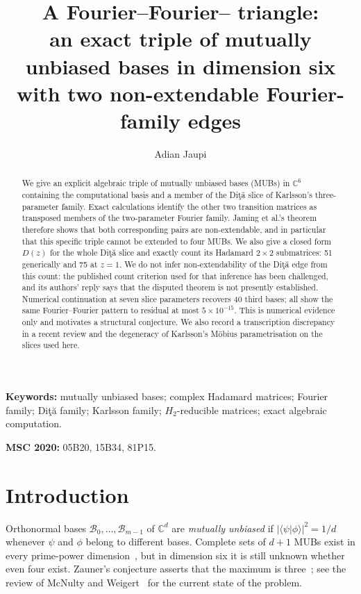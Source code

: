 \documentclass[11pt]{article}
\title{A Fourier--Fourier--\Dita{} triangle:\\
an exact triple of mutually unbiased bases in dimension six\\
with two non-extendable Fourier-family edges}
\author{Adian Jaupi%
}
\date{}
\numberwithin{equation}{section}
\theoremstyle{plain}
\theoremstyle{definition}
\theoremstyle{remark}
\newcommand{\C}{\mathbb{C}}
\newcommand{\Dita}{\texorpdfstring{Di\c{t}\u{a}}{Dita}}
\begin{document}
\maketitle

\begin{abstract}
We give an explicit algebraic triple of mutually unbiased bases (MUBs) in $\C^6$ containing the computational basis and a member of the \Dita{} slice of Karlsson's three-parameter family. Exact calculations identify the other two transition matrices as transposed members of the two-parameter Fourier family. Jaming et al.'s theorem therefore shows that both corresponding pairs are non-extendable, and in particular that this specific triple cannot be extended to four MUBs. We also give a closed form $D(z)$ for the whole \Dita{} slice and exactly count its Hadamard $2\times2$ submatrices: 51 generically and 75 at $z=1$. We do not infer non-extendability of the \Dita{} edge from this count: the published count criterion used for that inference has been challenged, and its authors' reply says that the disputed theorem is not presently established. Numerical continuation at seven slice parameters recovers 40 third bases; all show the same Fourier--Fourier pattern to residual at most $5\times10^{-15}$. This is numerical evidence only and motivates a structural conjecture. We also record a transcription discrepancy in a recent review and the degeneracy of Karlsson's M\"obius parametrisation on the slices used here.
\end{abstract}

\noindent\textbf{Keywords:} mutually unbiased bases; complex Hadamard matrices; Fourier family; \Dita{} family; Karlsson family; $H_2$-reducible matrices; exact algebraic computation.

\noindent\textbf{MSC 2020:} 05B20, 15B34, 81P15.

\section{Introduction}\label{sec:intro}

Orthonormal bases $\mathcal B_0,\dots,\mathcal B_{m-1}$ of $\C^d$ are \emph{mutually unbiased} if $|\langle\psi|\phi\rangle|^2=1/d$ whenever $\psi$ and $\phi$ belong to different bases. Complete sets of $d+1$ MUBs exist in every prime-power dimension~\cite{Ivanovic1981,Wootters1989}, but in dimension six it is still unknown whether even four exist. Zauner's conjecture asserts that the maximum is three~\cite{Zauner1999}; see the review of McNulty and Weigert~\cite{McNultyWeigert2026} for the current state of the problem.
\end{document}
